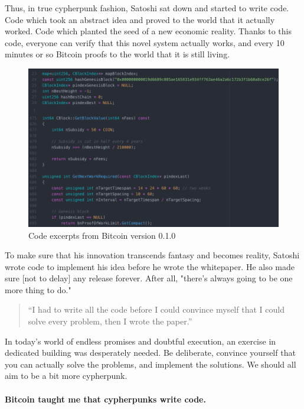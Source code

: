 Thus, in true cypherpunk fashion, Satoshi sat down and started to write
code. Code which took an abstract idea and proved to the world that it
actually worked. Code which planted the seed of a new economic reality.
Thanks to this code, everyone can verify that this novel system actually
works, and every 10 minutes or so Bitcoin proofs to the world that it is
still living.

\begin{figure}
  \includegraphics{assets/images/bitcoin-code.png}
  \caption{Code excerpts from Bitcoin version 0.1.0}
  \label{fig:bitcoin-code}
\end{figure}

To make sure that his innovation transcends fantasy and becomes reality,
Satoshi wrote code to implement his idea before he wrote the whitepaper.
He also made sure [not to delay] any release forever. After all,
"there's always going to be one more thing to do."

\begin{quotation}
``I had to write all the code before I could convince myself that I
could solve every problem, then I wrote the paper.''
\end{quotation}

In today's world of endless promises and doubtful execution, an exercise
in dedicated building was desperately needed. Be deliberate, convince
yourself that you can actually solve the problems, and implement the
solutions. We should all aim to be a bit more cypherpunk.

\paragraph{Bitcoin taught me that cypherpunks write code.}

